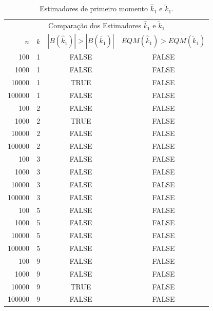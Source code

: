 \documentclass[12pt]{article}
\begin{document}
\begin{table}[H]
  \label{tab:gamma_r_m1}
  \centering
  \begin{tabular}{rccc}
    \toprule
    \multicolumn{4}{c}{Comparação dos Estimadores $\hat{k}_1$ e $\tilde{k}_1$}\\
    $n$ & $k$ & $|B(\hat{k}_1)|>|B(\tilde{k_1})|$ & $EQM(\hat{k}_1)>EQM(\tilde{k}_1)$ \\
    \midrule
    100 & 1 & FALSE & FALSE\\
    1000 & 1 & FALSE & FALSE\\
    10000 & 1 & TRUE & FALSE\\
    100000 & 1 & FALSE & FALSE\\
    100 & 2 & FALSE & FALSE\\
    1000 & 2 & TRUE & FALSE\\
    10000 & 2 & FALSE & FALSE\\
    100000 & 2 & FALSE & FALSE\\
    100 & 3 & FALSE & FALSE\\
    1000 & 3 & FALSE & FALSE\\
    10000 & 3 & FALSE & FALSE\\
    100000 & 3 & FALSE & FALSE\\
    100 & 5 & FALSE & FALSE\\
    1000 & 5 & FALSE & FALSE\\
    10000 & 5 & FALSE & FALSE\\
    100000 & 5 & FALSE & FALSE\\
    100 & 9 & FALSE & FALSE\\
    1000 & 9 & FALSE & FALSE\\
    10000 & 9 & TRUE & FALSE\\
    100000 & 9 & FALSE & FALSE\\
    \bottomrule
  \end{tabular}
  \caption{Estimadores de primeiro momento $\hat{k}_1$ e $\tilde{k}_1$.}
\end{table}
\end{document}
